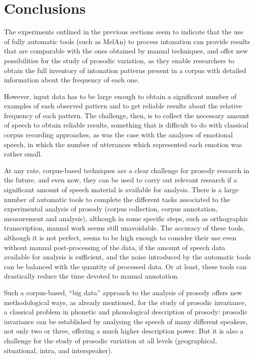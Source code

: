 \documentclass[output=paper]{langsci/langscibook}
\begin{document}
\section{Conclusions}

The experiments outlined in the previous sections seem to indicate that the use of fully automatic tools (such as MelAn) to process intonation can provide results that are comparable with the ones obtained by manual techniques, and offer new possibilities for the study of prosodic variation, as they enable researchers to obtain the full inventory of intonation patterns present in a corpus with detailed information about the frequency of each one.

However, input data has to be large enough to obtain a significant number of examples of each observed pattern and to get reliable results about the relative frequency of each pattern. The challenge, then, is to collect the necessary amount of speech to obtain reliable results, something that is difficult to do with classical corpus recording approaches, as was the case with the analyses of emotional speech, in which the number of utterances which represented each emotion was rather small.

At any rate, corpus-based techniques are a clear challenge for prosody research in the future, and even now, they can be used to carry out relevant research if a significant amount of speech material is available for analysis. There is a large number of automatic tools to complete the different tasks associated to the experimental analysis of prosody (corpus collection, corpus annotation, measurement and analysis), although in some specific steps, such as orthographic transcription, manual work seems still unavoidable. The accuracy of these tools, although it is not perfect, seems to be high enough to consider their use even without manual post-processing of the data, if the amount of speech data available for analysis is sufficient, and the noise introduced by the automatic tools can be balanced with the quantity of processed data. Or at least, these tools can drastically reduce the time devoted to manual annotation.

Such a corpus-based, ``big data'' approach to the analysis of prosody offers new methodological ways, as already mentioned, for the study of prosodic invariance, a classical problem in phonetic and phonological description of prosody: prosodic invariance can be established by analysing the speech of many different speakers, not only two or three, offering a much higher description power. But it is also a challenge for the study of prosodic variation at all levels (geographical, situational, intra, and interspeaker).
\end{document}
